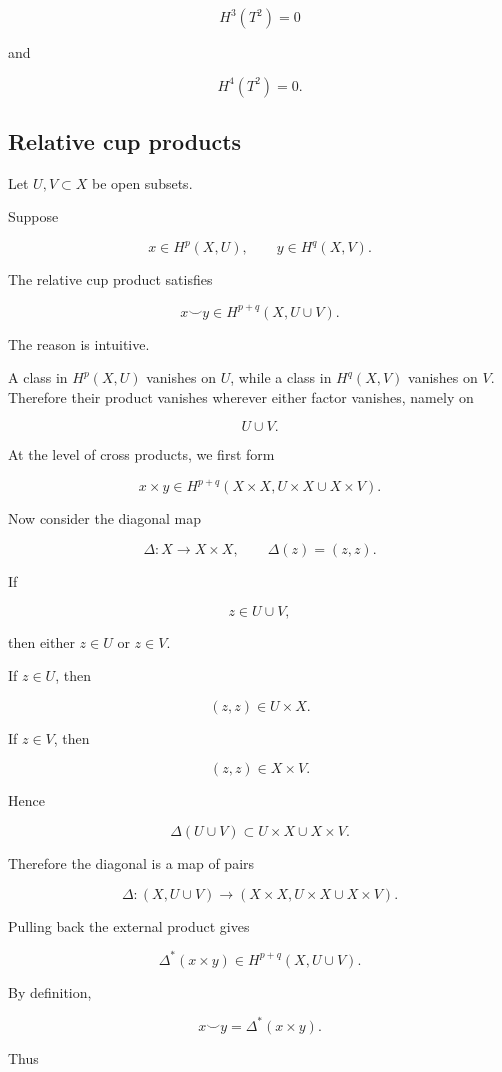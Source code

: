\documentclass[12pt,a4paper]{article}
\theoremstyle{notespace}
\begin{document}
\[
H^3(T^2)=0
\]

and

\[
H^4(T^2)=0.
\]

\subsection{Relative cup products}

Let \(U,V\subset X\) be open subsets.

Suppose

\[
x\in H^p(X,U),
\qquad
y\in H^q(X,V).
\]

The relative cup product satisfies

\[
\boxed{
	x\smile y\in H^{p+q}(X,U\cup V).
}
\]

The reason is intuitive.

A class in \(H^p(X,U)\) vanishes on \(U\), while a class in \(H^q(X,V)\) vanishes on \(V\). Therefore their product vanishes wherever either factor vanishes, namely on

\[
U\cup V.
\]

At the level of cross products, we first form

\[
x\times y
\in
H^{p+q}(X\times X, U\times X\cup X\times V).
\]

Now consider the diagonal map

\[
\Delta:X\to X\times X,
\qquad
\Delta(z)=(z,z).
\]

If

\[
z\in U\cup V,
\]

then either \(z\in U\) or \(z\in V\).

If \(z\in U\), then

\[
(z,z)\in U\times X.
\]

If \(z\in V\), then

\[
(z,z)\in X\times V.
\]

Hence

\[
\Delta(U\cup V)
\subset
U\times X\cup X\times V.
\]

Therefore the diagonal is a map of pairs

\[
\Delta:
(X,U\cup V)
\longrightarrow
(X\times X, U\times X\cup X\times V).
\]

Pulling back the external product gives

\[
\Delta^*(x\times y)
\in
H^{p+q}(X,U\cup V).
\]

By definition,

\[
x\smile y
=
\Delta^*(x\times y).
\]

Thus
\end{document}
